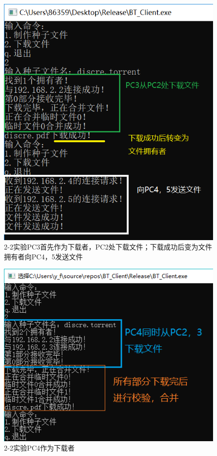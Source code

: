 \documentclass[thesis]{thesis}
\begin{document}
	\begin{minipage}{0.5\linewidth}
	\begin{figure}[H]
		\centering
		\includegraphics[width=\linewidth]{fig/PC3_22.png}
		\caption{2-2实验\quad PC3首先作为下载者，PC2处下载文件；下载成功后变为文件拥有者向PC4，5发送文件}
		\label{res:PC3_22}
	\end{figure}
	\end{minipage}
	\begin{minipage}{0.5\linewidth}
	\begin{figure}[H]
		\centering
		\includegraphics[width=\linewidth]{fig/PC4_22.png}
		\caption{2-2实验\quad PC4作为下载者}
		\label{res:PC4_22}
	\end{figure}
	\end{minipage}
\end{document}
